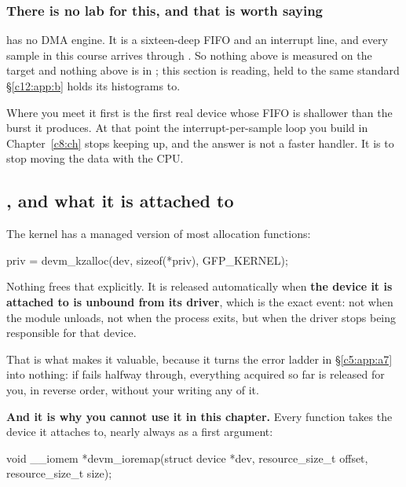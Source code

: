 \subsubsection{There is no lab for this, and that is worth saying}
\label{c6:app:a:there-is-no-lab-for-this-and-that-is-worth-saying}

 has no DMA engine. It is a sixteen-deep FIFO and an interrupt line, and every sample
in this course arrives through . So nothing above is measured on the target and nothing
above is in ; this section is reading, held to the same standard \S\ref{c12:app:b}
holds its histograms to.

Where you meet it first is the first real device whose FIFO is shallower than the burst it produces.
At that point the interrupt-per-sample loop you build in Chapter~\ref{c8:ch} stops keeping up, and
the answer is not a faster handler. It is to stop moving the data with the CPU.

\subsection{, and what it is attached to}
\label{c6:app:a7}

The kernel has a managed version of most allocation functions:

\begin{ccode}
priv = devm_kzalloc(dev, sizeof(*priv), GFP_KERNEL);
\end{ccode}

\noindent Nothing frees that explicitly. It is released automatically when \textbf{the device it is
attached to is unbound from its driver}, which is the exact event: not when the module unloads, not
when the process exits, but when the driver stops being responsible for that device.

That is what makes it valuable, because it turns the error ladder in \S\ref{c5:app:a7} into nothing:
if  fails halfway through, everything acquired so far is released for you, in reverse
order, without your writing any of it.

\textbf{And it is why you cannot use it in this chapter.} Every  function takes the
device it attaches to, nearly always as a  first argument:

\begin{ccode}
void __iomem *devm_ioremap(struct device *dev, resource_size_t offset, resource_size_t size);
\end{ccode}

